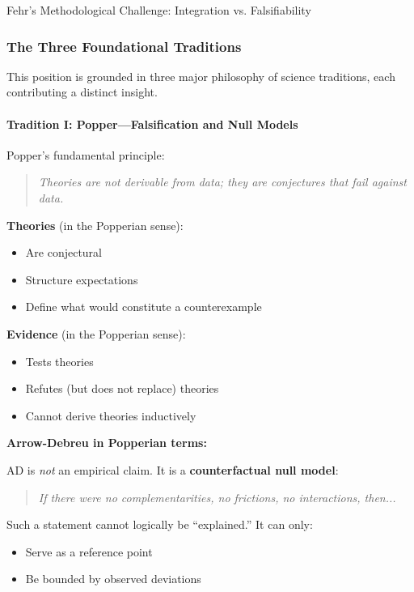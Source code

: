 \begin{chapter}{Fehr's Methodological Challenge: Integration vs. Falsifiability}
\subsubsection{The Three Foundational Traditions}

This position is grounded in three major philosophy of science traditions, each contributing a distinct insight.

\paragraph{Tradition I: Popper---Falsification and Null Models}

Popper's fundamental principle:
\begin{quote}
\textit{Theories are not derivable from data; they are conjectures that fail against data.}
\end{quote}

\textbf{Theories} (in the Popperian sense):
\begin{itemize}[noitemsep]
    \item Are conjectural
    \item Structure expectations
    \item Define what would constitute a counterexample
\end{itemize}

\textbf{Evidence} (in the Popperian sense):
\begin{itemize}[noitemsep]
    \item Tests theories
    \item Refutes (but does not replace) theories
    \item Cannot derive theories inductively
\end{itemize}

\textbf{Arrow-Debreu in Popperian terms:}

AD is \textit{not} an empirical claim. It is a \textbf{counterfactual null model}:
\begin{quote}
\textit{If there were no complementarities, no frictions, no interactions, then...}
\end{quote}

Such a statement cannot logically be ``explained.'' It can only:
\begin{itemize}[noitemsep]
    \item Serve as a reference point
    \item Be bounded by observed deviations
\end{itemize}


\end{chapter}
